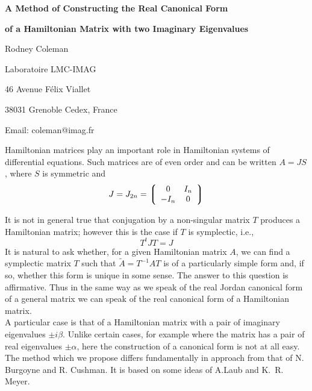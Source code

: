 

\centerline{\bf A Method of Constructing the Real Canonical Form}
\centerline{\bf of a Hamiltonian Matrix with two Imaginary Eigenvalues}

\vskip 0.3cm

\centerline{Rodney Coleman}
\centerline{Laboratoire LMC-IMAG}
\centerline{46 Avenue F\'{e}lix Viallet}
\centerline{38031 Grenoble Cedex, France}
\centerline{Email: coleman@imag.fr}

\vskip 0.3cm

Hamiltonian matrices play an important role in Hamiltonian systems of differential equations. Such matrices are of even order and can be written $A = JS$,
where $S$ is symmetric and
$$
J = J_{2n} = \left\lgroup \begin{array}{cc}
		0 & I_n\\
		-I_n & 0
		\end{array} \right\rgroup
$$

\noindent It is not in general true that conjugation by a non-singular matrix
$T$ produces a Hamiltonian matrix; however this is the case if $T$ is
symplectic, i.e.,
$$
T^tJT=J
$$
\noindent It is natural to ask whether, for a given Hamiltonian matrix
$A$, we can find a symplectic matrix $T$ such that $\tilde{A} =
T^{-1}AT$ is of a particularly simple form and, if so, whether this
form is unique in some sense. The answer to this question is
affirmative. Thus in the same way as we speak of the real Jordan
canonical form of a general matrix we can speak of the real canonical
form of a Hamiltonian matrix.\\

\noindent A particular case is that of a Hamiltonian matrix with a pair
of imaginary eigenvalues $\pm  i \beta $. Unlike certain cases, for
example where the matrix has a pair of real eigenvalues $\pm \alpha $,
here the construction of a canonical form is not at all easy. The
method which we propose differs fundamentally in approach from that of
N. Burgoyne and R. Cushman.  It is based on some ideas of A.Laub and
K.~R. Meyer.


